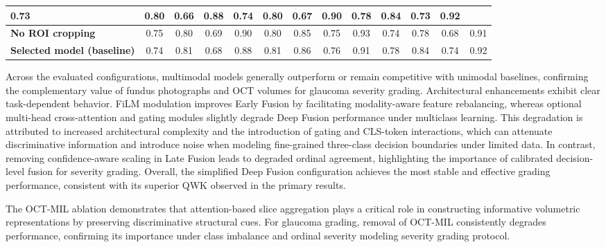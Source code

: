 \documentclass[preprint,12pt]{elsarticle}
\begin{document}
\begin{table}[!t]
\begin{tabular}{|l|cccc|cccc|cccc|}
        0.73                               & 0.80 & 0.66 & 0.88 &
        0.74                               & 0.80 & 0.67 & 0.90 &
        0.78                               & 0.84 & 0.73 & 0.92         \\
        \hline
        \textbf{No ROI cropping}           &
        0.75                               & 0.80 & 0.69 & 0.90 &
        0.80                               & 0.85 & 0.75 & 0.93 &
        0.74                               & 0.78 & 0.68 & 0.91         \\
        \hline
        \textbf{Selected model (baseline)} &
        0.74                               & 0.81 & 0.68 & 0.88 &
        0.81                               & 0.86 & 0.76 & 0.91 &
        0.78                               & 0.84 & 0.74 & 0.92         \\
        \hline
    \end{tabular}
\end{table}

Across the evaluated configurations, multimodal models generally outperform or remain competitive with unimodal baselines, confirming the complementary value of fundus photographs and OCT volumes for glaucoma severity grading. Architectural enhancements exhibit clear task-dependent behavior. FiLM modulation improves Early Fusion by facilitating modality-aware feature rebalancing, whereas optional multi-head cross-attention and gating modules slightly degrade Deep Fusion performance under multiclass learning. This degradation is attributed to increased architectural complexity and the introduction of gating and CLS-token interactions, which can attenuate discriminative information and introduce noise when modeling fine-grained three-class decision boundaries under limited data. In contrast, removing confidence-aware scaling in Late Fusion leads to degraded ordinal agreement, highlighting the importance of calibrated decision-level fusion for severity grading. Overall, the simplified Deep Fusion configuration achieves the most stable and effective grading performance, consistent with its superior QWK observed in the primary results.

The OCT-MIL ablation demonstrates that attention-based slice aggregation plays a critical role in constructing informative volumetric representations by preserving discriminative structural cues. For glaucoma grading, removal of OCT-MIL consistently degrades performance, confirming its importance under class imbalance and ordinal severity modeling severity grading protocol.
\end{document}
